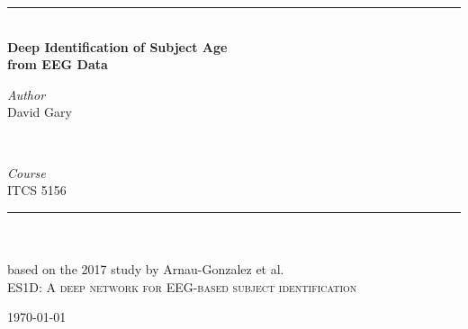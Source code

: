 \documentclass[letterpaper,twocolumn,11pt]{article}
\begin{document}
\begin{titlepage}
	\newcommand{\HRule}{\rule{\linewidth}{0.5mm}}
	
	\center

	\HRule\\[0.4cm]
	
	{\huge\bfseries Deep Identification of Subject Age\\ from EEG Data}\\[0.4cm]

	\begin{minipage}{0.4\textwidth}
		\begin{flushleft}
			\large
			\textit{Author}\\
			David Gary
		\end{flushleft}
	\end{minipage}
	~
	\begin{minipage}{0.4\textwidth}
		\begin{flushright}
			\large
			\textit{Course}\\
			ITCS 5156
		\end{flushright}
	\end{minipage}
	
	\HRule\\[1.5cm]
	
  \textit\\ based on the 2017 study by Arnau-Gonzalez et al.\\[0.5cm]
	\textsc{\Large ES1D: A deep network for EEG-based subject identification}\cite{mininet}\\[0.5cm]

	\vfill\vfill\vfill
	
	{\large\today} 
	
	\vfill
	
\end{titlepage}



{
  \small
  
  
}
\end{document}

